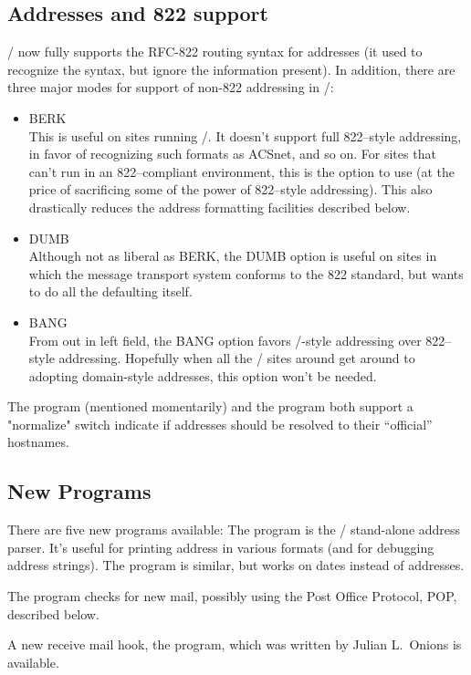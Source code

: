 \subsection*	{Addresses and 822 support}
\MH/ now fully supports the RFC-822 routing syntax for addresses
(it used to recognize the syntax, but ignore the information present).
In addition,
there are three major modes for support of non-822 addressing in \MH/:
\begin{itemize}
\item	BERK\\
This is useful on sites running \SendMail/.
It doesn't support full 822--style addressing,
in favor of recognizing such formats as ACSnet, and so on.
For sites that can't run in an 822--compliant environment,
this is the option to use
(at the price of sacrificing some of the power of 822--style addressing).
This also drastically reduces the address formatting facilities described
below.

\item	DUMB\\
Although not as liberal as BERK,
the DUMB option is useful on sites in which the message transport system
conforms to the 822 standard,
but wants to do all the defaulting itself.

\item	BANG\\
From out in left field,
the BANG option favors \UUCP/-style addressing over 822--style addressing.
Hopefully when all the \UUCP/ sites around get around to adopting domain-style
addresses, this option won't be needed.
\end{itemize}

The  program (mentioned momentarily) and the  program
both support a \switch"normalize" switch indicate if addresses should be
resolved to their ``official'' hostnames.

\subsection*	{New Programs}
There are five new programs available:
The  program is the \MH/ stand-alone address parser.
It's useful for printing address in various formats
(and for debugging address strings).
The  program is similar, but works on dates instead of addresses.

The  program checks for new mail,
possibly using the Post Office Protocol, POP, described below.

A new receive mail hook,
the  program,
which was written by Julian L.~Onions is available.

